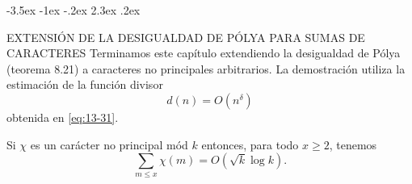 \documentclass[12pt,a4paper]{book}
\makeatletter
\renewcommand\section{\@startsection{section}{1}{\z@}%
  {-3.5ex \@plus -1ex \@minus -.2ex}%
  {2.3ex \@plus .2ex}%
  {\normalfont\Large\bfseries\raggedright}}
\makeatother
\begin{document}
    \section{EXTENSIÓN DE LA DESIGUALDAD DE PÓLYA PARA SUMAS DE CARACTERES}
    Terminamos este capítulo extendiendo la desigualdad de Pólya (teorema 8.21) a caracteres no
    principales arbitrarios. La demostración utiliza la estimación de la función divisor
    \begin{equation*}
        d(n)=O(n^{\delta})
    \end{equation*}
    obtenida en \eqref{eq:13-31}.

    \begin{teorema}\label{teo:13-15}
        Si $\chi$ es un carácter no principal mód $k$ entonces, para todo $x\geq2$, tenemos
        \begin{equation*}
            \sum_{m\leq x}\chi(m)=O(\sqrt{k}\log k).
        \end{equation*}
    \end{teorema}
\end{document}
